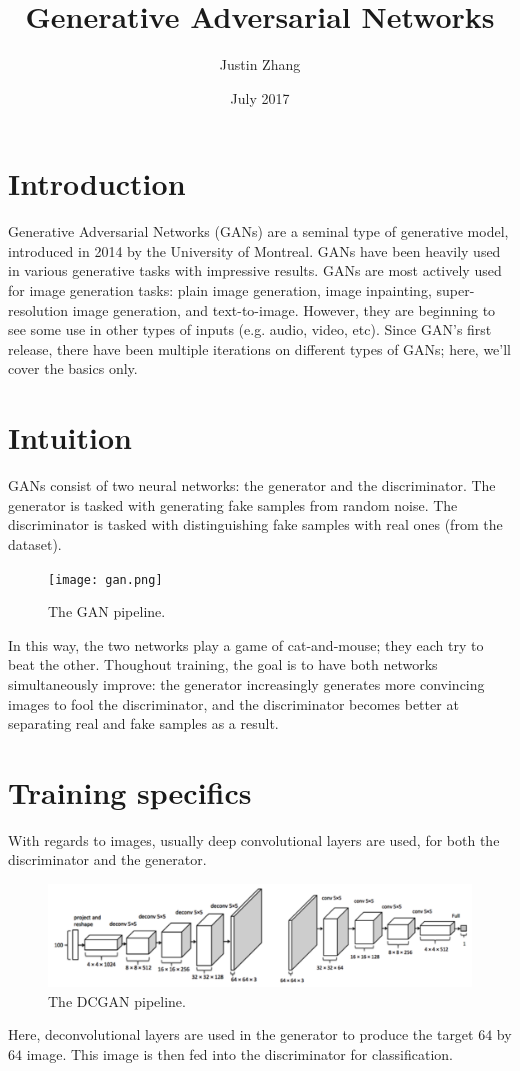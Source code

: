 \documentclass{article}
\title{Generative Adversarial Networks}
\author{Justin Zhang}
\date{July 2017}
\begin{document}
\maketitle

\section{Introduction}
    Generative Adversarial Networks (GANs) are a seminal type of generative model, introduced in 2014 by the University of Montreal. GANs have been heavily used in various generative tasks with impressive results. GANs are most actively used for image generation tasks: plain image generation, image inpainting, super-resolution image generation, and text-to-image. However, they are beginning to see some use in other types of inputs (e.g. audio, video, etc). Since GAN's first release, there have been multiple iterations on different types of GANs; here, we'll cover the basics only.
\section{Intuition}
    GANs consist of two neural networks: the generator and the discriminator. The generator is tasked with generating fake samples from random noise. The discriminator is tasked with distinguishing fake samples with real ones (from the dataset).
    \begin{center}
    \begin{figure}[H]
        \centerline{\texttt{[image: gan.png]}}
        \caption{The GAN pipeline.}
        \label{fig:gan}
    \end{figure}
    \end{center}
    In this way, the two networks play a game of cat-and-mouse; they each try to beat the other. Thoughout training, the goal is to have both networks simultaneously improve: the generator increasingly generates more convincing images to fool the discriminator, and the discriminator becomes better at separating real and fake samples as a result.
\section{Training specifics}
    With regards to images, usually deep convolutional layers are used, for both the discriminator and the generator.
    \begin{figure}[H]
        \centerline{\includegraphics[scale=0.5]{dcgan.png}}
        \caption{The DCGAN pipeline.}
        \label{fig:dcgan}
    \end{figure}
    Here, deconvolutional layers are used in the generator to produce the target $64$ by $64$ image. This image is then fed into the discriminator for classification.
    
\end{document}
